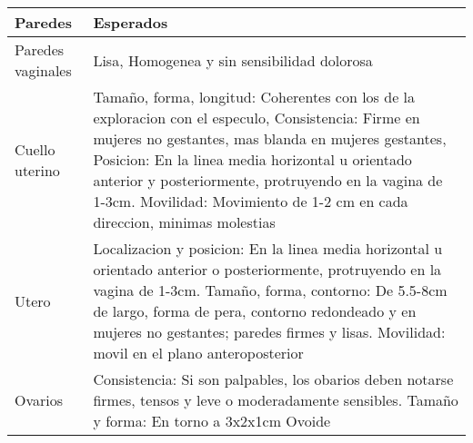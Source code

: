 \documentclass[
]{article}
\begin{document}
\begin{longtable}[]{@{}ll@{}}
\toprule
\begin{minipage}[b]{0.05\columnwidth}\raggedright
Paredes\strut
\end{minipage} & \begin{minipage}[b]{0.90\columnwidth}\raggedright
Esperados\strut
\end{minipage}\tabularnewline
\midrule
\endhead
\begin{minipage}[t]{0.05\columnwidth}\raggedright
Paredes vaginales\strut
\end{minipage} & \begin{minipage}[t]{0.90\columnwidth}\raggedright
Lisa, Homogenea y sin sensibilidad dolorosa\strut
\end{minipage}\tabularnewline
\begin{minipage}[t]{0.05\columnwidth}\raggedright
Cuello uterino\strut
\end{minipage} & \begin{minipage}[t]{0.90\columnwidth}\raggedright
Tamaño, forma, longitud: Coherentes con los de la exploracion con el
especulo, Consistencia: Firme en mujeres no gestantes, mas blanda en
mujeres gestantes, Posicion: En la linea media horizontal u orientado
anterior y posteriormente, protruyendo en la vagina de 1-3cm. Movilidad:
Movimiento de 1-2 cm en cada direccion, minimas molestias\strut
\end{minipage}\tabularnewline
\begin{minipage}[t]{0.05\columnwidth}\raggedright
Utero\strut
\end{minipage} & \begin{minipage}[t]{0.90\columnwidth}\raggedright
Localizacion y posicion: En la linea media horizontal u orientado
anterior o posteriormente, protruyendo en la vagina de 1-3cm. Tamaño,
forma, contorno: De 5.5-8cm de largo, forma de pera, contorno redondeado
y en mujeres no gestantes; paredes firmes y lisas. Movilidad: movil en
el plano anteroposterior\strut
\end{minipage}\tabularnewline
\begin{minipage}[t]{0.05\columnwidth}\raggedright
Ovarios\strut
\end{minipage} & \begin{minipage}[t]{0.90\columnwidth}\raggedright
Consistencia: Si son palpables, los obarios deben notarse firmes, tensos
y leve o moderadamente sensibles. Tamaño y forma: En torno a 3x2x1cm
Ovoide\strut
\end{minipage}\tabularnewline
\bottomrule
\end{longtable}
\end{document}
